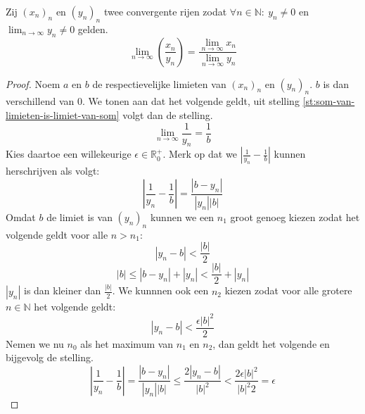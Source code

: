 \documentclass[main.tex]{subfiles}
\begin{document}
\begin{bst}
  Zij $(x_{n})_{n}$ en $(y_{n})_{n}$ twee convergente rijen zodat $\forall n\in \mathbb{N}:\ y_{n}\neq 0$ en $\lim_{n\rightarrow \infty}y_{n} \neq 0$ gelden.
  \[ \lim_{n \rightarrow \infty}\left(\frac{x_{n}}{y_{n}}\right) = \frac{\lim_{n\rightarrow \infty}x_{n}}{\lim_{n\rightarrow \infty}y_{n}} \]

  \begin{proof}
    Noem $a$ en $b$ de respectievelijke limieten van $(x_{n})_{n}$ en $(y_{n})_{n}$.
    $b$ is dan verschillend van $0$.
    We tonen aan dat het volgende geldt, uit stelling \ref{st:som-van-limieten-is-limiet-van-som} volgt dan de stelling.
    \[ \lim_{n\rightarrow \infty}\frac{1}{y_{n}} = \frac{1}{b} \]
    Kies daartoe een willekeurige $\epsilon \in \mathbb{R}_{0}^{+}$.
    Merk op dat we $\left|\frac{1}{y_{n}}-\frac{1}{b}\right|$ kunnen herschrijven als volgt:
    \[ \left|\frac{1}{y_{n}}-\frac{1}{b}\right| = \frac{|b-y_{n}|}{|y_{n}||b|} \]
    Omdat $b$ de limiet is van $(y_{n})_{n}$ kunnen we een $n_{1}$ groot genoeg kiezen zodat het volgende geldt voor alle $n>n_{1}$:
    \[ |y_{n}-b| < \frac{|b|}{2} \]
    \[ |b| \le |b-y_{n}| +|y_{n}| < \frac{|b|}{2} + |y_{n}| \]
    $|y_{n}|$ is dan kleiner dan $\frac{|b|}{2}$.
    We kunnnen ook een $n_{2}$ kiezen zodat voor alle grotere $n\in \mathbb{N}$ het volgende geldt:
    \[ |y_{n}-b| < \frac{\epsilon|b|^{2}}{2} \]
    Nemen we nu $n_{0}$ als het maximum van $n_{1}$ en $n_{2}$, dan geldt het volgende en bijgevolg de stelling.
    \[ \left|\frac{1}{y_{n}}-\frac{1}{b}\right| = \frac{|b-y_{n}|}{|y_{n}||b|} \le \frac{2|y_{n}-b|}{|b|^{2}} < \frac{2\epsilon|b|^{2}}{|b|^{2}2} = \epsilon \]
  \end{proof}
\end{bst}
\end{document}
